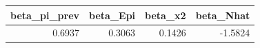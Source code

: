 \begin{tabular}{rrrr}
\toprule
beta_pi_prev & beta_Epi & beta_x2 & beta_Nhat \\
\midrule
0.6937 & 0.3063 & 0.1426 & -1.5824 \\
\bottomrule
\end{tabular}
